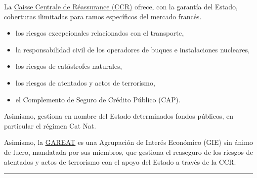 \begin{f}
	La \href{http://www.ccr.fr}{Caisse Centrale de Réassurance (CCR)} ofrece, con la garantía del Estado, coberturas ilimitadas para ramos específicos del mercado francés.
	\begin{itemize}
		\item   los riesgos excepcionales relacionados con el transporte,
		\item   la responsabilidad civil de los operadores de buques e instalaciones nucleares,
		\item   los riesgos de catástrofes naturales,
		\item   los riesgos de atentados y actos de terrorismo,
		\item   el Complemento de Seguro de Crédito Público (CAP).
		\end {itemize}
		Asimismo, gestiona en nombre del Estado determinados fondos públicos, en particular el régimen Cat Nat.
		
		Asimismo, la \href{http://www.gareat.com/}{GAREAT} es una Agrupación de Interés Económico (GIE) sin ánimo de lucro, mandatada por sus miembros, que gestiona el reaseguro de los riesgos de atentados y actos de terrorismo con el apoyo del Estado a través de la CCR.
\end{f}
\hrule

